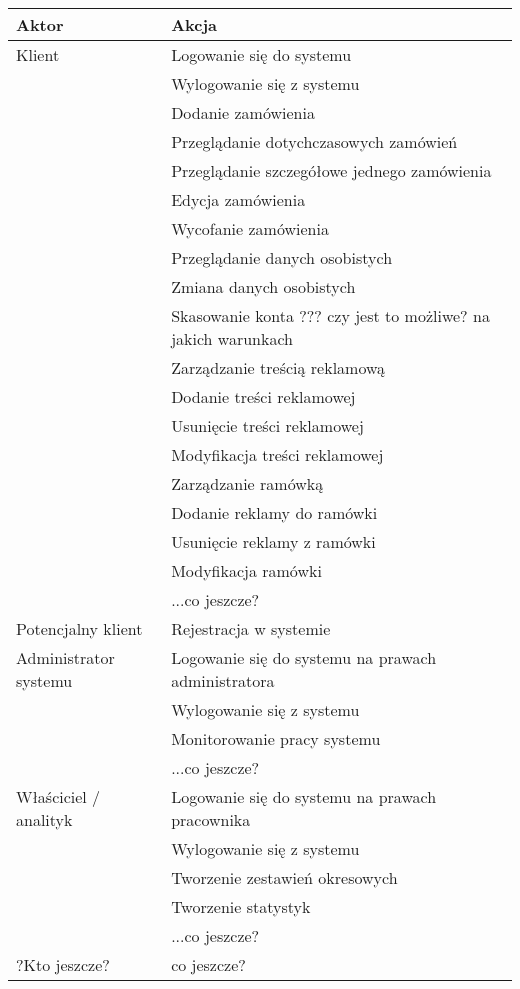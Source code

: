 \documentclass[10pt,a4paper,titlepage]{article} %
\begin{document}
		\begin {center}
		\begin{tabular}{|p{4cm}|p{8cm}|}
		  \hline
		  {\bf Aktor} & {\bf Akcja} \\ \hline
		  \hline
		  Klient & Logowanie się do systemu \\ \cline{2-2}
		  & Wylogowanie się z systemu \\ \cline{2-2}
		  & Dodanie zamówienia \\ \cline{2-2}
		  & Przeglądanie dotychczasowych zamówień \\ \cline{2-2}
		  & Przeglądanie szczegółowe jednego zamówienia \\ \cline{2-2}
		  & Edycja zamówienia \\ \cline{2-2}
		  & Wycofanie zamówienia \\ \cline{2-2}
		  & Przeglądanie danych osobistych \\ \cline{2-2}
		  & Zmiana danych osobistych \\ \cline{2-2}
		  & Skasowanie konta ??? czy jest to możliwe? na jakich warunkach \\ \cline{2-2}
		  & Zarządzanie treścią reklamową \\ \cline{2-2}
		  & Dodanie treści reklamowej \\ \cline{2-2}
		  & Usunięcie treści reklamowej \\ \cline{2-2}
		  & Modyfikacja treści reklamowej \\ \cline{2-2}
		  & Zarządzanie ramówką \\ \cline{2-2}
		  & Dodanie reklamy do ramówki \\ \cline{2-2}
		  & Usunięcie reklamy z ramówki \\ \cline{2-2}
		  & Modyfikacja ramówki \\ \cline{2-2}
		  & ...co jeszcze? \\ \cline{2-2}
		  \hline
		  Potencjalny klient & Rejestracja w systemie \\ \cline{2-2}
		  \hline
		  Administrator systemu & Logowanie się do systemu na prawach administratora \\ \cline{2-2}
		  & Wylogowanie się z systemu \\ \cline{2-2}
		  & Monitorowanie pracy systemu \\ \cline{2-2}
		  & ...co jeszcze? \\ \cline{2-2}
		  \hline
		  Właściciel / analityk & Logowanie się do systemu na prawach pracownika \\ \cline{2-2}
		  & Wylogowanie się z systemu \\ \cline{2-2}
		  & Tworzenie zestawień okresowych \\ \cline{2-2}
		  & Tworzenie statystyk \\ \cline{2-2}
		  & ...co jeszcze? \\ \cline{2-2}
		  \hline
		  ?Kto jeszcze? & co jeszcze? \\ \cline{2-2}
		  \hline
		\end{tabular}
		\end{center}
\end{document}
